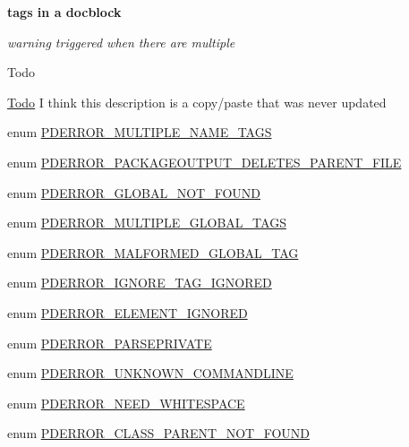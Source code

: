 \begin{Indent}{\bf tags in a docblock}\par
{\em warning triggered when there are multiple \begin{DoxyRefDesc}{\-Todo}
\item[\hyperlink{todo__todo000079}{\-Todo}]\-I think this description is a copy/paste that was never updated \end{DoxyRefDesc}
}\begin{DoxyCompactItemize}
\item 
enum \hyperlink{_errors_8inc_ac8b893d07ee6ab988fd695e1d01be518}{\-P\-D\-E\-R\-R\-O\-R\-\_\-\-M\-U\-L\-T\-I\-P\-L\-E\-\_\-\-N\-A\-M\-E\-\_\-\-T\-A\-G\-S} 
\item 
enum \hyperlink{_errors_8inc_acec66b09025d8fe33d0e04a275535b3a}{\-P\-D\-E\-R\-R\-O\-R\-\_\-\-P\-A\-C\-K\-A\-G\-E\-O\-U\-T\-P\-U\-T\-\_\-\-D\-E\-L\-E\-T\-E\-S\-\_\-\-P\-A\-R\-E\-N\-T\-\_\-\-F\-I\-L\-E} 
\item 
enum \hyperlink{_errors_8inc_a8a30a0d98eb516160ab83e6d2029fd15}{\-P\-D\-E\-R\-R\-O\-R\-\_\-\-G\-L\-O\-B\-A\-L\-\_\-\-N\-O\-T\-\_\-\-F\-O\-U\-N\-D} 
\item 
enum \hyperlink{_errors_8inc_a0f407484fe419439c12f78c605ee180b}{\-P\-D\-E\-R\-R\-O\-R\-\_\-\-M\-U\-L\-T\-I\-P\-L\-E\-\_\-\-G\-L\-O\-B\-A\-L\-\_\-\-T\-A\-G\-S} 
\item 
enum \hyperlink{_errors_8inc_a61ceb2acacb7b2f89075cd2cfb8aca86}{\-P\-D\-E\-R\-R\-O\-R\-\_\-\-M\-A\-L\-F\-O\-R\-M\-E\-D\-\_\-\-G\-L\-O\-B\-A\-L\-\_\-\-T\-A\-G} 
\item 
enum \hyperlink{_errors_8inc_a9f9010eeabb1c62436d5bc5db7789c9f}{\-P\-D\-E\-R\-R\-O\-R\-\_\-\-I\-G\-N\-O\-R\-E\-\_\-\-T\-A\-G\-\_\-\-I\-G\-N\-O\-R\-E\-D} 
\item 
enum \hyperlink{_errors_8inc_a873bb00783b95d78afae9a67c29b36fd}{\-P\-D\-E\-R\-R\-O\-R\-\_\-\-E\-L\-E\-M\-E\-N\-T\-\_\-\-I\-G\-N\-O\-R\-E\-D} 
\item 
enum \hyperlink{_errors_8inc_ae5a083474e2aa7dfcacbb8812eb46c33}{\-P\-D\-E\-R\-R\-O\-R\-\_\-\-P\-A\-R\-S\-E\-P\-R\-I\-V\-A\-T\-E} 
\item 
enum \hyperlink{_errors_8inc_a8cad5c4b948c81f81e8abfe85a5ea31e}{\-P\-D\-E\-R\-R\-O\-R\-\_\-\-U\-N\-K\-N\-O\-W\-N\-\_\-\-C\-O\-M\-M\-A\-N\-D\-L\-I\-N\-E} 
\item 
enum \hyperlink{_errors_8inc_a5ce27b5319c822cc387bb8510a31e440}{\-P\-D\-E\-R\-R\-O\-R\-\_\-\-N\-E\-E\-D\-\_\-\-W\-H\-I\-T\-E\-S\-P\-A\-C\-E} 
\item 
enum \hyperlink{_errors_8inc_a25436b54459fc28d3cdf61a0d60bfb4c}{\-P\-D\-E\-R\-R\-O\-R\-\_\-\-C\-L\-A\-S\-S\-\_\-\-P\-A\-R\-E\-N\-T\-\_\-\-N\-O\-T\-\_\-\-F\-O\-U\-N\-D} 

\end{DoxyCompactItemize}
\end{Indent}
